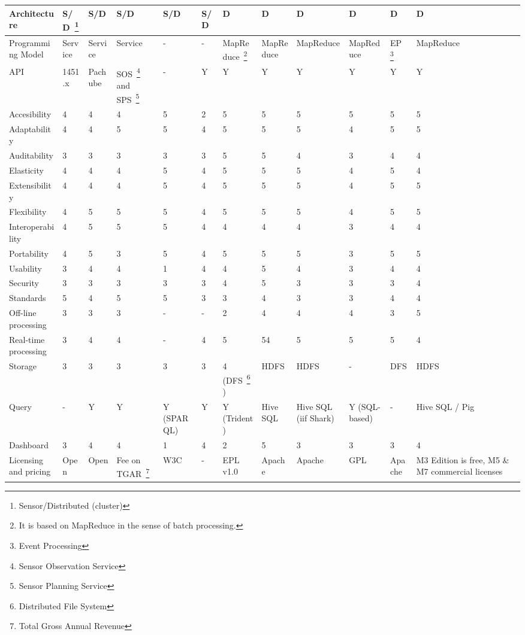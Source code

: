 \begin{sidewaystable}[!ht]
\begin{center}
\begin{tabular}[c]{|p{1.7cm}|p{1.5cm}|p{1.5cm}|p{1.5cm}|p{1.5cm}|p{1.5cm}|p{1.5cm}|p{1.5cm}|p{1.5cm}|p{1.5cm}|p{1.5cm}|p{1.5cm}|}
  Architecture & S/D~\footnote{Sensor/Distributed (cluster)} & S/D  & S/D  & S/D  & S/D & D & D & D & D  & D  & D  \\ \hline  
  Programming Model & Service & Service & Service & - & -  & MapReduce~\footnote{It is based on MapReduce in the sense of batch processing.} & MapReduce & MapReduce & MapReduce &EP~\footnote{Event Processing}  &  MapReduce\\ \hline  
  API & 1451.x & Pachube  & SOS~\footnote{Sensor Observation Service} and SPS~\footnote{Sensor Planning Service}  & - & Y & Y & Y & Y & Y  & Y & Y \\ \hline  
  Accesibility & 4 & 4 & 4 & 5 & 2 & 5 & 5 & 5 & 5 & 5 & 5 \\ \hline  
  Adaptability & 4 & 4& 5 & 5 & 4 & 5 & 5 & 5 & 4 & 5 & 5 \\ \hline  
  Auditability & 3 &3 & 3 & 3 & 3 & 5 &  5& 4 & 3 & 4 & 4 \\ \hline  
  Elasticity & 4 & 4& 4 & 5 & 4 & 5 & 5 & 5 &4  & 5 & 4 \\ \hline  
  Extensibility & 4 & 4& 4 & 5 & 4 & 5 & 5 & 5 & 4 & 5 & 5 \\ \hline  
  Flexibility &4  & 5& 5 & 5 & 4 & 5 & 5 & 5 & 4 & 5 & 5 \\ \hline  
  Interoperability & 4 &5& 5 & 5 & 4 & 4 & 4 & 4& 3 & 4 & 4\\ \hline  
  Portability & 4 &5 & 3 &5  & 4 & 5 & 5 & 5 & 3 & 5 & 5\\ \hline  
  Usability & 3 &4 & 4 & 1 & 4 & 4 &5  & 4 & 3 & 4 & 4\\ \hline  
  Security & 3 & 3& 3 & 3 & 3 & 4 & 5 & 3 & 3 & 3 & 4 \\ \hline  
  Standards & 5 & 4 & 5& 5 & 3 & 3 & 4 & 3 & 3 & 4 & 4 \\ \hline  
  Off-line processing & 3 &3  &3 & - & - & 2 & 4 & 4 & 4 & 3 & 5 \\ \hline  
  Real-time processing & 3 &4 & 4 & - & 4 & 5 & 54 & 5 & 5 & 5 & 4  \\ \hline  
  Storage & 3 &3 & 3 & 3 & 3 & 4 (DFS~\footnote{Distributed File System}) & HDFS & HDFS & -  & DFS & HDFS \\ \hline  
  Query & - & Y& Y & Y (SPARQL) & Y  & Y (Trident) & Hive SQL & Hive SQL (iif Shark)  & Y (SQL-based) &  - & Hive SQL / Pig\\ \hline  
  Dashboard & 3 & 4 & 4 & 1 & 4 & 2 & 5 & 3 & 3 & 3 & 4\\ \hline  
  Licensing and pricing & Open & Open & Fee on TGAR~\footnote{Total Gross Annual Revenue} & W3C & - & EPL v1.0 & Apache & Apache & GPL & Apache  & M3 Edition is free, M5 \& M7 commercial licenses\\ \hline  

\end{tabular}
\end{center}
\end{sidewaystable}
